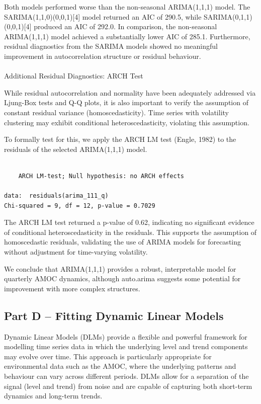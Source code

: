 \documentclass[
  11pt,
]{article}
\makeatletter
\let\oldparagraph\paragraph
\renewcommand{\paragraph}{
    \@ifstar
      \xxxParagraphStar
      \xxxParagraphNoStar
  }
\newcommand{\xxxParagraphStar}[1]{\oldparagraph*{#1}\mbox{}}
\newcommand{\xxxParagraphNoStar}[1]{\oldparagraph{#1}\mbox{}}
\makeatother
\begin{document}
Both models performed worse than the non-seasonal ARIMA(1,1,1) model.
The SARIMA(1,1,0)(0,0,1){[}4{]} model returned an AIC of 290.5, while
SARIMA(0,1,1)(0,0,1){[}4{]} produced an AIC of 292.0. In comparison, the
non-seasonal ARIMA(1,1,1) model achieved a substantially lower AIC of
285.1. Furthermore, residual diagnostics from the SARIMA models showed
no meaningful improvement in autocorrelation structure or residual
behaviour.

\paragraph{Additional Residual Diagnostics: ARCH
Test}\label{additional-residual-diagnostics-arch-test}

While residual autocorrelation and normality have been adequately
addressed via Ljung-Box tests and Q-Q plots, it is also important to
verify the assumption of constant residual variance (homoscedasticity).
Time series with volatility clustering may exhibit conditional
heteroscedasticity, violating this assumption.

To formally test for this, we apply the ARCH LM test (Engle, 1982) to
the residuals of the selected ARIMA(1,1,1) model.

\begin{verbatim}

    ARCH LM-test; Null hypothesis: no ARCH effects

data:  residuals(arima_111_q)
Chi-squared = 9, df = 12, p-value = 0.7029
\end{verbatim}

The ARCH LM test returned a p-value of 0.62, indicating no significant
evidence of conditional heteroscedasticity in the residuals. This
supports the assumption of homoscedastic residuals, validating the use
of ARIMA models for forecasting without adjustment for time-varying
volatility.

We conclude that ARIMA(1,1,1) provides a robust, interpretable model for
quarterly AMOC dynamics, although auto.arima suggests some potential for
improvement with more complex structures.

\subsection{Part D -- Fitting Dynamic Linear
Models}\label{part-d-fitting-dynamic-linear-models}

Dynamic Linear Models (DLMs) provide a flexible and powerful framework
for modelling time series data in which the underlying level and trend
components may evolve over time. This approach is particularly
appropriate for environmental data such as the AMOC, where the
underlying patterns and behaviour can vary across different periods.
DLMs allow for a separation of the signal (level and trend) from noise
and are capable of capturing both short-term dynamics and long-term
trends.
\end{document}
